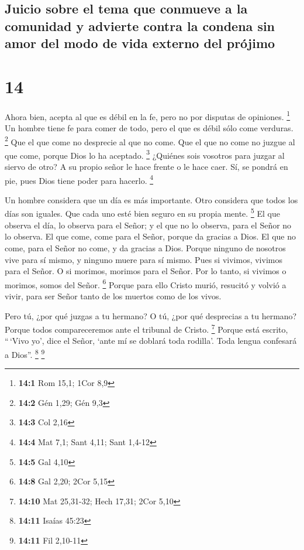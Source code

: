 \hypertarget{juicio-sobre-el-tema-que-conmueve-a-la-comunidad-y-advierte-contra-la-condena-sin-amor-del-modo-de-vida-externo-del-pruxf3jimo}{%
\subsection{Juicio sobre el tema que conmueve a la comunidad y advierte
contra la condena sin amor del modo de vida externo del
prójimo}\label{juicio-sobre-el-tema-que-conmueve-a-la-comunidad-y-advierte-contra-la-condena-sin-amor-del-modo-de-vida-externo-del-pruxf3jimo}}

\hypertarget{section-13}{%
\section{14}\label{section-13}}

 Ahora bien, acepta al que es débil en la fe, pero no por
disputas de opiniones. \footnote{\textbf{14:1} Rom 15,1; 1Cor 8,9}
 Un hombre tiene fe para comer de todo, pero el que es
débil sólo come verduras. \footnote{\textbf{14:2} Gén 1,29; Gén 9,3}
 Que el que come no desprecie al que no come. Que el que
no come no juzgue al que come, porque Dios lo ha aceptado. \footnote{\textbf{14:3}
  Col 2,16}  ¿Quiénes sois vosotros para juzgar al siervo
de otro? A su propio señor le hace frente o le hace caer. Sí, se pondrá
en pie, pues Dios tiene poder para hacerlo. \footnote{\textbf{14:4} Mat
  7,1; Sant 4,11; Sant 1,4-12}

 Un hombre considera que un día es más importante. Otro
considera que todos los días son iguales. Que cada uno esté bien seguro
en su propia mente. \footnote{\textbf{14:5} Gal 4,10}  El
que observa el día, lo observa para el Señor; y el que no lo observa,
para el Señor no lo observa. El que come, come para el Señor, porque da
gracias a Dios. El que no come, para el Señor no come, y da gracias a
Dios.  Porque ninguno de nosotros vive para sí mismo, y
ninguno muere para sí mismo.  Pues si vivimos, vivimos
para el Señor. O si morimos, morimos para el Señor. Por lo tanto, si
vivimos o morimos, somos del Señor. \footnote{\textbf{14:8} Gal 2,20;
  2Cor 5,15}  Porque para ello Cristo murió, resucitó y
volvió a vivir, para ser Señor tanto de los muertos como de los vivos.

 Pero tú, ¿por qué juzgas a tu hermano? O tú, ¿por qué
desprecias a tu hermano? Porque todos compareceremos ante el tribunal de
Cristo. \footnote{\textbf{14:10} Mat 25,31-32; Hech 17,31; 2Cor 5,10}
 Porque está escrito, ``\,`Vivo yo', dice el Señor, `ante
mí se doblará toda rodilla'. Toda lengua confesará a Dios''. \footnote{\textbf{14:11}
  Isaías 45:23} \footnote{\textbf{14:11} Fil 2,10-11}

